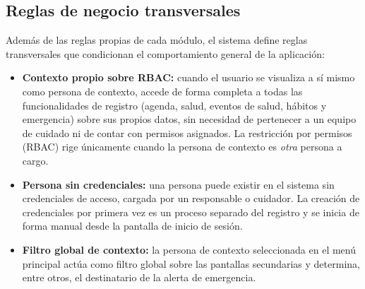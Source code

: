 \documentclass[a4paper,12pt]{article}
\begin{document}
    \subsection{Reglas de negocio transversales}
    \par Además de las reglas propias de cada módulo, el sistema define reglas transversales que condicionan el comportamiento general de la aplicación:
    \begin{itemize}
        \item \textbf{Contexto propio sobre RBAC:} cuando el usuario se visualiza a sí mismo como persona de contexto, accede de forma completa a todas las funcionalidades de registro (agenda, salud, eventos de salud, hábitos y emergencia) sobre sus propios datos, sin necesidad de pertenecer a un equipo de cuidado ni de contar con permisos asignados. La restricción por permisos (RBAC) rige únicamente cuando la persona de contexto es \textit{otra} persona a cargo.
        \item \textbf{Persona sin credenciales:} una persona puede existir en el sistema sin credenciales de acceso, cargada por un responsable o cuidador. La creación de credenciales por primera vez es un proceso separado del registro y se inicia de forma manual desde la pantalla de inicio de sesión.
        \item \textbf{Filtro global de contexto:} la persona de contexto seleccionada en el menú principal actúa como filtro global sobre las pantallas secundarias y determina, entre otros, el destinatario de la alerta de emergencia.
    \end{itemize}
\end{document}
